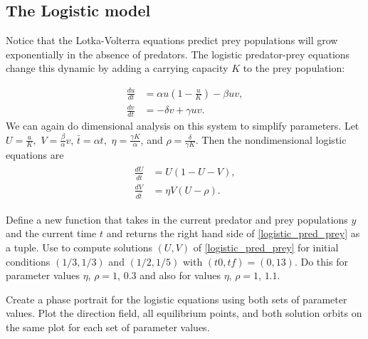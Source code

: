 \subsection*{The Logistic model}
Notice that the Lotka-Volterra equations predict prey populations will grow exponentially in the absence of predators. The logistic predator-prey equations change this dynamic by adding a carrying capacity $K$ to the prey population:%

\begin{align*}
	\frac{du}{dt} &= \alpha u\left(1 -\frac{u}{K}\right) - \beta uv,\\
	\frac{dv}{dt} &= -\delta v + \gamma uv.
\end{align*}
We can again do dimensional analysis on this system to simplify parameters. Let $U = \frac{u}{K},$ $V = \frac{\beta}{\alpha}v$, $\bar{t} = \alpha t,$  $\eta = \frac{\gamma K}{\alpha}$, and $\rho = \frac{\delta}{\gamma K}$.
Then the nondimensional logistic equations are
\begin{align}
	\begin{split}
	\frac{dU}{d\bar{t}} &= U(1-U-V),\\
	\frac{dV}{d\bar{t}} &= \eta V (U-\rho).
	\end{split} \label{logistic_pred_prey}
\end{align}

\begin{problem}
Define a new function  that takes in the current predator and prey populations $y$ and the current time $t$ and returns the right hand side of \eqref{logistic_pred_prey} as a tuple. Use  to compute solutions $(U,V)$ of \eqref{logistic_pred_prey}
for initial conditions $(1/3, 1/3)$ and $(1/2, 1/5)$ with $(t0,tf)=(0,13)$.
Do this for parameter values $\eta$, $\rho = 1$, $0.3$ and also for values $\eta$, $\rho = 1$, $1.1$.

Create a phase portrait for the logistic equations using both sets of parameter values.
Plot the direction field, all equilibrium points, and both solution orbits on the same plot for each set of parameter values.
\end{problem} 

